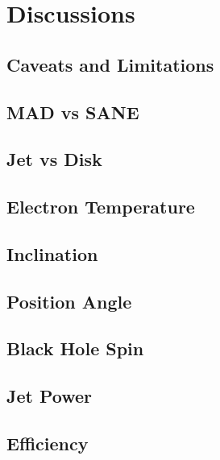 \section{Discussions}\label{sec:discussions}

\subsection{Caveats and Limitations}

\subsection{MAD vs SANE}

\subsection{Jet vs Disk}

\subsection{Electron Temperature}

\subsection{Inclination}

\subsection{Position Angle}

\subsection{Black Hole Spin}

\subsection{Jet Power}

\subsection{Efficiency}
